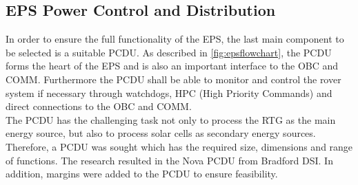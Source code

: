 

\subsection{EPS Power Control and Distribution}
In order to ensure the full functionality of the EPS, the last main component to be selected is a suitable PCDU. As described in \autoref{fig:epsflowchart}, the PCDU forms the heart of the EPS and is also an important interface to the OBC and COMM. Furthermore the PCDU shall be able to monitor and control the rover system if necessary through watchdogs, HPC (High Priority Commands) and direct connections to the OBC and COMM.\\
The PCDU has the challenging task not only to process the RTG as the main energy source, but also to process solar cells as secondary energy sources. Therefore, a PCDU was sought which has the required size, dimensions and range of functions. The research resulted in the Nova PCDU from Bradford DSI. In addition, margins were added to the PCDU to ensure feasibility.

